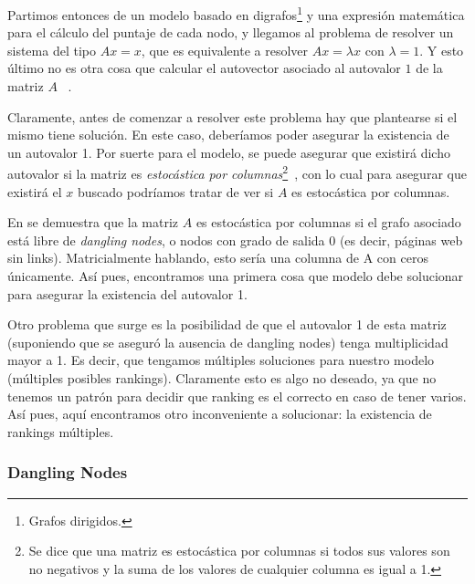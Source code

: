 \par Partimos entonces de un modelo basado en digrafos\footnote{Grafos
dirigidos.} y una expresi\'on matem\'atica para el c\'alculo del puntaje de cada
nodo, y llegamos al problema de resolver un sistema del tipo $Ax = x$, que es
equivalente a resolver $Ax = \lambda x$ con $\lambda = 1$. Y esto \'ultimo no es
otra cosa que calcular el autovector asociado al autovalor $1$ de la matriz $A$
~\cite[p.~443]{Burden2010}.

\par Claramente, antes de comenzar a resolver este problema hay que plantearse
si el mismo tiene soluci\'on. En este caso, deber\'iamos poder asegurar la
existencia de un autovalor 1. Por suerte para el modelo, se puede asegurar que
existir\'a dicho autovalor si la matriz es \emph{estoc\'astica por
columnas}\footnote{Se dice que una matriz es estoc\'astica por columnas si todos
sus valores son no negativos y la suma de los valores de cualquier columna es
igual a 1.}~\cite[p.572]{Bryan2006}, con lo cual para asegurar que existir\'a el
$x$ buscado podr\'iamos tratar de ver si $A$ es estoc\'astica por
columnas.

\par En \cite[p.572]{Bryan2006} se demuestra que la matriz $A$ es estoc\'astica
por columnas si el grafo asociado est\'a libre de \emph{dangling nodes}, o
nodos con grado de salida 0 (es decir, p\'aginas web sin links). Matricialmente
hablando, esto ser\'ia una columna de A con ceros \'unicamente. As\'i pues,
encontramos una primera cosa que modelo debe solucionar para asegurar la
existencia del autovalor 1.

\par Otro problema que surge es la posibilidad de que el autovalor 1 de esta
matriz (suponiendo que se aseguró la ausencia de dangling nodes) tenga
multiplicidad mayor a 1. Es decir, que tengamos m\'ultiples soluciones para
nuestro modelo (m\'ultiples posibles rankings). Claramente esto es algo no
deseado, ya que no tenemos un patr\'on para decidir que ranking es el correcto
en caso de tener varios. As\'i pues, aqu\'i encontramos otro inconveniente a
solucionar: la existencia de rankings m\'ultiples.


\subsubsection*{Dangling Nodes}\label{subsubsec:dang_nodes}

